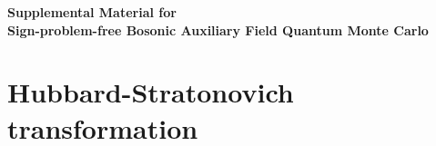 \clearpage
\onecolumngrid
\newpage
\widetext
\thispagestyle{empty}

\makeatletter
\let\addcontentsline\oldaddcontentsline
\makeatother

\setcounter{section}{0}
\setcounter{subsection}{0}
\setcounter{equation}{0}
\setcounter{figure}{0}
\setcounter{table}{0}
\setcounter{secnumdepth}{2}
\renewcommand{\thesection}{\Roman{section}}
\renewcommand{\thesubsection}{\Alph{subsection}}
\renewcommand{\theequation}{S\arabic{equation}}
\renewcommand{\thefigure}{S\arabic{figure}}
\renewcommand{\thetable}{S\arabic{table}}
\renewcommand{\theHsection}{SM.\Roman{section}}
\renewcommand{\theHsubsection}{SM.\Roman{section}.\Alph{subsection}}
\renewcommand{\theHequation}{SM.\arabic{equation}}
\renewcommand{\theHfigure}{SM.\arabic{figure}}
\renewcommand{\theHtable}{SM.\arabic{table}}

\renewcommand\floatpagefraction{0.9}
\renewcommand\textfraction{0.1}

\begin{center}
    \vspace{3em}
    {\Large\textbf{Supplemental Material for}}\\
    \vspace{1em}
    {\large\textbf{Sign-problem-free Bosonic Auxiliary Field Quantum Monte Carlo}}\\
    \vspace{0.5em}
\end{center}

\tableofcontents

\section{Hubbard-Stratonovich transformation}
\label{app:hs_general}

